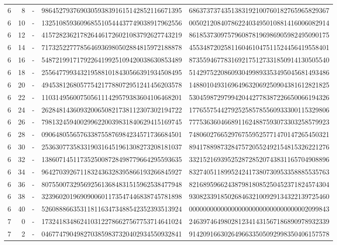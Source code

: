 \begin{longtable}{rrrll}
6 & 8 & - & 9864527937690305938391615142852116671395 & 6863737374351383192100760182765965829367 \\
6 & 10 & - & 1325108593609685510544437749038917962556 & 0050212084078622403495010881416006082914 \\
6 & 12 & - & 4157282362178264461726021083792627743219 & 8618537309757960878196986905982495090175 \\
6 & 14 & - & 7173252277785646936980502884815972188878 & 4553487202581160461047511524456419558401 \\
6 & 16 & - & 5487219917179226419925109420038630853489 & 8735594677831692175127331850914130505540 \\
6 & 18 & - & 2556477993432195881018430566391934508495 & 5142975220860930499893353495045681493486 \\
6 & 20 & - & 4945381268057754217788072951241456203578 & 1488010493169649632069250904381612821825 \\
6 & 22 & - & 1103149560075056111429579383604106468201 & 5304598729799420442778387226650066194326 \\
6 & 24 & - & 2628481436093200650821738112307302194722 & 1776557544279252585785560933300115329806 \\
6 & 26 & - & 7981324594002996220039831840629415169745 & 7775363604668911624887593073303258579923 \\
6 & 28 & - & 0906480556576338755876984234571736684501 & 7480602766529767559525771470147265450321 \\
6 & 30 & - & 2536307735833190316451961308273208181037 & 8941788987328475720552492154815326221276 \\
6 & 32 & - & 1386071451173525008728498779664295593635 & 3321521693952528728520743831165704908896 \\
6 & 34 & - & 9642703926711832436328395866193266845927 & 8327405118995242417380730953358885535763 \\
6 & 36 & - & 8075500732956925613684831515962538477948 & 8216895966243879818085250452371824574304 \\
6 & 38 & - & 3239602019690900601173547446838745781898 & 9308233918502684632100929134322139725460 \\
6 & 40 & - & 5260888663531181163473488542352393513924 & 0000000000000000000000000000000002099843 \\
7 & 0 & - & 1732418348624103122786627567753714641024 & 2463974649802812341431567186890978932339 \\
7 & 2 & - & 0467747904982703859837320402934550932841 & 9142091663026496633505092998350406157578 \\

\end{longtable}
